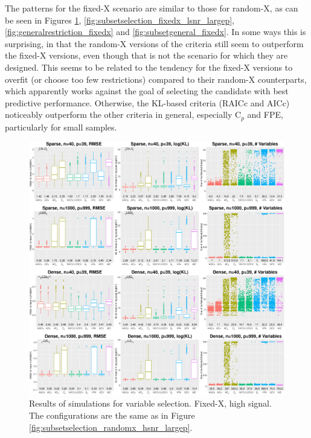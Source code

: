 The patterns for the fixed-X scenario are similar to those for random-X, as can be seen in Figures \ref{fig:subsetselection_fixedx_hsnr_largep}, \ref{fig:subsetselection_fixedx_lsnr_largep}, \ref{fig:generalrestriction_fixedx} and \ref{fig:subsetgeneral_fixedx}. In some ways this is surprising, in that the random-X versions of the criteria still seem to outperform the fixed-X versions, even though that is not the scenario for which they are designed. This seems to be related to the tendency for the fixed-X versions to overfit (or choose too few restrictions) compared to their random-X counterparts, which apparently works against the goal of selecting the candidate with best predictive performance. Otherwise, the KL-based criteria (RAICc and AICc) noticeably outperform the other criteria in general, especially $\mbox{C}_p$ and FPE, particularly for small samples.

\begin{figure}[!ht]
  \centering
  \includegraphics[width=\textwidth]{figures/main/fixedx_VS_hsnr.eps}
  \caption{Results of simulations for variable selection. Fixed-X, high signal. The configurations are the same as in Figure \ref{fig:subsetselection_randomx_hsnr_largep}.}
  \label{fig:subsetselection_fixedx_hsnr_largep}
\end{figure}



